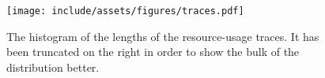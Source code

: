 \begin{figure}[t]
  \centering
  \texttt{[image: include/assets/figures/traces.pdf]}
  \vspace{-1.5em}
  \caption{
    The histogram of the lengths of the resource-usage traces. It has been
    truncated on the right in order to show the bulk of the distribution better.
  }
  \vspace{-1.5em}
\end{figure}

